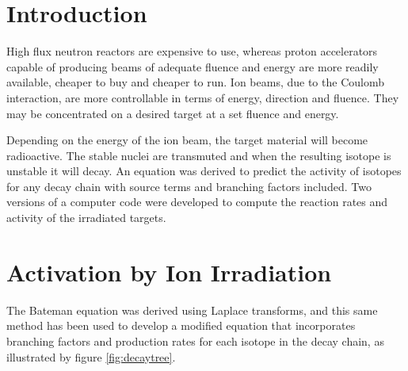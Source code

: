 \section{Introduction}


High flux neutron reactors are expensive to use, whereas proton accelerators capable of producing beams of adequate fluence and energy are more readily available, cheaper to buy and cheaper to run.  Ion beams, due to the Coulomb interaction, are more controllable in terms of energy, direction and fluence.  They may be concentrated on a desired target at a set fluence and energy.

Depending on the energy of the ion beam, the target material will become radioactive.  The stable nuclei are transmuted and when the resulting isotope is unstable it will decay.  An equation was derived to predict the activity of isotopes for any decay chain with source terms and branching factors included.  Two versions of a computer code were developed to compute the reaction rates and activity of the irradiated targets.




\section{Activation by Ion Irradiation}



The Bateman equation was derived using Laplace transforms, and this same method has been used to develop a modified equation that incorporates branching factors and production rates for each isotope in the decay chain, as illustrated by figure \ref{fig:decaytree}.

